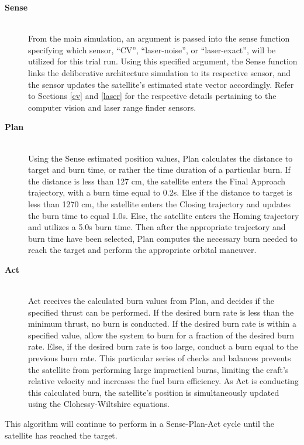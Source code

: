 \documentclass[journal, 10pt]{IEEEtran}
\begin{document}
\begin{description}
\item[\textbf{Sense}] \hfill \\
From the main simulation, an argument is passed into the sense function specifying which sensor, ``CV'', ``laser-noise'', or ``laser-exact'', will be utilized for this trial run. Using this specified argument, the Sense function links the deliberative architecture simulation to its respective sensor, and the sensor updates the satellite's estimated state vector accordingly. Refer to Sections \ref{cv} and \ref{laser} for the respective details pertaining to the computer vision and laser range finder sensors.

\item[\textbf{Plan}] \hfill \\
Using the Sense estimated position values, Plan calculates the distance to target and burn time, or rather the time duration of a particular burn. If the distance is less than 127 cm, the satellite enters the Final Approach trajectory, with a burn time equal to 0.2s. Else if the distance to target is less than 1270 cm, the satellite enters the Closing trajectory and updates the burn time to equal 1.0s. Else, the satellite enters the Homing trajectory and utilizes a 5.0s burn time. Then after the appropriate trajectory and burn time have been selected, Plan computes the necessary burn needed to reach the target and perform the appropriate orbital maneuver.

\item[\textbf{Act}] \hfill \\
Act receives the calculated burn values from Plan, and decides if the specified thrust can be performed. If the desired burn rate is less than the minimum thrust, no burn is conducted. If the desired burn rate is within a specified value, allow the system to burn for a fraction of the desired burn rate. Else, if the desired burn rate is too large, conduct a burn equal to the previous burn rate. This particular series of checks and balances prevents the satellite from performing large impractical burns, limiting the craft's relative velocity and increases the fuel burn efficiency. As Act is conducting this calculated burn, the satellite's position is simultaneously updated using the Clohessy-Wiltshire equations. 
\end{description}

This algorithm will continue to perform in a Sense-Plan-Act cycle until the satellite has reached the target.
\end{document}
